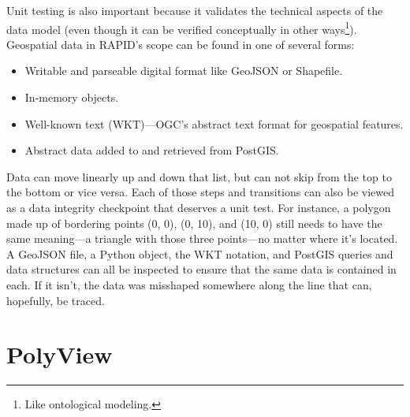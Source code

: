 Unit testing is also important because it validates the technical aspects of the data model (even though it can be verified conceptually in other ways\footnote{Like ontological modeling.}). Geospatial data in RAPID's scope can be found in one of several forms:

\begin{itemize}
\item Writable and parseable digital format like GeoJSON or Shapefile.
\item In-memory objects.
\item Well-known text (WKT)---OGC's abstract text format for geospatial features.
\item Abstract data added to and retrieved from PostGIS.
\end{itemize}

Data can move linearly up and down that list, but can not skip from the top to the bottom or vice versa. Each of those steps and transitions can also be viewed as a data integrity checkpoint that deserves a unit test. For instance, a polygon made up of bordering points (0, 0), (0, 10), and (10, 0) still needs to have the same meaning---a triangle with those three points---no matter where it's located. A GeoJSON file, a Python object, the WKT notation, and PostGIS queries and data structures can all be inspected to ensure that the same data is contained in each. If it isn't, the data was misshaped somewhere along the line that can, hopefully, be traced.

\section{PolyView}
\label{polyview_details}


